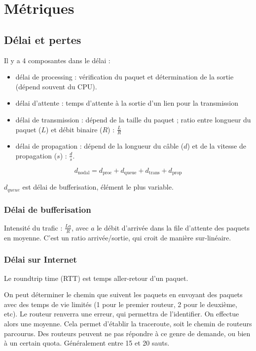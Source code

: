 
\section{Métriques}

	\subsection{Délai et pertes}
	
	Il y a 4 composantes dans le délai :
	\begin{itemize}
		\item délai de processing : vérification du paquet et détermination de la sortie (dépend souvent du CPU).
		\item délai d'attente : temps d'attente à la sortie d'un lien pour la transmission
		\item délai de transmission : dépend de la taille du paquet ; ratio entre longueur du paquet ($L$) et débit binaire ($R$) : $\frac{L}{R}$
		\item délai de propagation : dépend de la longueur du câble ($d$) et de la vitesse de propagation ($s$) : $\frac{d}{s}$.
	\end{itemize}
	

	$$d_{\text{nodal}} = d_{\text{proc}} + d_{\text{queue}} + d_{\text{trans}} + d_{\text{prop}}$$
	
	$d_{queue}$ est délai de bufferisation, élément le plus variable.	
	
		\subsubsection{Délai de bufferisation}
		
		Intensité du trafic : $ \frac{La}{R} $, avec $a$ le débit d'arrivée dans la file d'attente des paquets en moyenne. C'est un ratio arrivée/sortie, qui croit de manière sur-linéaire.
		
		
		
		\subsubsection{Délai sur Internet}
		
		
		Le roundtrip time (RTT) est temps aller-retour d'un paquet.
		
		On peut déterminer le chemin que suivent les paquets en  envoyant des paquets avec des temps de vie limités (1 pour le premier routeur, 2 pour le deuxième, etc). Le routeur renverra une erreur, qui permettra de l'identifier. On effectue alors une moyenne. Cela permet d'établir la traceroute, soit le chemin de routeurs parcourus. Des routeurs peuvent ne pas répondre à ce genre de demande, ou bien à un certain quota. Généralement entre 15 et 20 sauts.
	
